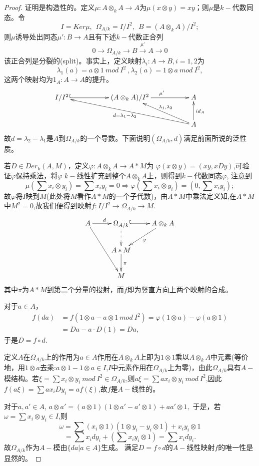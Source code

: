 \documentclass[UTF8]{article}
\begin{document}
\begin{proof}
	证明是构造性的。定义$\mu:A\otimes_{k}A\rightarrow A$为$\mu(x\otimes y)=xy$；则$\mu$是$k-$代数同态。令
	$$I=Ker\mu,\ \ \Omega_{A/k}=I/I^2,\ \ B=(A\otimes_{k}A)/I^2;$$
	则$\mu$诱导处出同态$\mu':B\rightarrow A$且有下述$k-$代数正合列
	$$
	0\rightarrow \Omega_{A/k}\rightarrow B\stackrel{\mu'}{\rightarrow}A\rightarrow 0
	$$
	该正合列是分裂的(split)。事实上，定义映射$\lambda_{i}:A\rightarrow B,i=1,2$为
	$$
	\lambda_{1}(a)=a\otimes 1\ mod \ I^2\ ,\lambda_{2}(a)=1\otimes a\ mod \ I^2,
	$$
	这两个映射均为$1_{A}:A\rightarrow A$的提升。
	$$
	\xymatrix{
	I/I^{2}\ar@{^{(}->}[rr]& &(A\otimes_{k}A)/I^{2}\ar[rr]^{\mu'}&&A\\
	& &&&A\ar[ullll]^{d=\lambda_{1}-\lambda_{2}}\ar[ull]_{\lambda_{1},\lambda_{2}}\ar[u]_{id_{A}}
}
	$$
	故$d=\lambda_{2}-\lambda_{1}$是$A$到$\Omega_{A/k}$的一个导数。下面说明$(\Omega_{A/k},d)$满足前面所说的泛性质。
	
	若$D\in Der_{k}(A,M)$，定义$\varphi:A\otimes_{k} A\rightarrow A*M$为
	$\varphi(x\otimes y)=(xy,xDy)$,可验证$\varphi$保持乘法，将$\varphi$ $k-$线性扩充到整个$A\otimes_{k}A$上，则得到$k-$代数同态$\varphi$,
	注意到$$
	\mu(\sum x_{i}\otimes y_{i})=\sum x_{i} y_{i}=0\Rightarrow \varphi(\sum x_{i}\otimes y_{i})=(0,\sum x_{i}y_{i});
	$$
	故$\varphi$将$I$映到$M$(此处将$M$看作$A*M$的一个子代数)，由$A*M$中乘法定义知,在$A*M$中$M^2=0$,故我们便得到映射$f:I/I^2\rightarrow \Omega_{A/k}\rightarrow M$.
	$$
	\xymatrix{
A\ar[r]^{d}\ar[rdd]&\Omega_{A/k}\ar@{.>}[d]\ar@{^{(}->}[r]&A\otimes_{k} A\ar[ld]^{\varphi}\\
	&A*M\ar[d]^{\pi}& \\
	&M&
}
	$$
	其中$\pi$为$A*M$到第二个分量的投射，而$f$即为竖直方向上两个映射的合成。
	
	对于$a\in A$，
	\[
	\begin{split}
	f(da)&=f(1\otimes a-a\otimes 1\ mod \ I^2 )=\varphi(1\otimes a)-\varphi(a\otimes 1)\\
	&=Da-a\cdot D(1)=Da,
	\end{split}
	\]
	于是$D=f\circ d$.
	
	定义$A$在$\Omega_{A/k}$上的作用为$a\in A$作用在$A\otimes_{k} A$上即为$1\otimes 1$乘以$A\otimes_{k}A$中元素(等价地，用$1\otimes a$去乘:$a\otimes 1-1\otimes a\in I$,$I$中元素作用在$\Omega_{A/k}$上为零)，由此$\Omega_{A/k}$具有$A-$模结构。若$\xi=\sum x_{i}\otimes y_{i}\ mod \ I^2\in \Omega_{A/k}$,则$a\xi=\sum ax_{i}\otimes y_{i}\ mod \ I^2$,因此
	$f(a\xi)=\sum ax_{i}Dy_{i}=af(\xi)$,故$f$是$A-$线性的。
	
	对于$a,a'\in A$,
	$a\otimes a'=(a\otimes 1)(1\otimes a'-a'\otimes 1)+aa'\otimes 1,$
	于是，若$\omega=\sum x_{i}\otimes y_{i}\in I$,则
	$$\omega= \sum (x_{i}\otimes 1)(1\otimes y_{i}-y_{i}\otimes 1)+x_{i}y_{i}\otimes 1$$
	$$
	=\sum x_{i}dy_{i}+(\sum x_{i}y_{i}\otimes 1)
	=\sum x_{i}dy_{i}.
	$$
	故$\Omega_{A/k}$作为$A-$模由$\{da|a\in A\}$生成。
	满足$D=f\circ d$的$A-$线性映射$f$的唯一性是显然的。
\end{proof}
\end{document}
